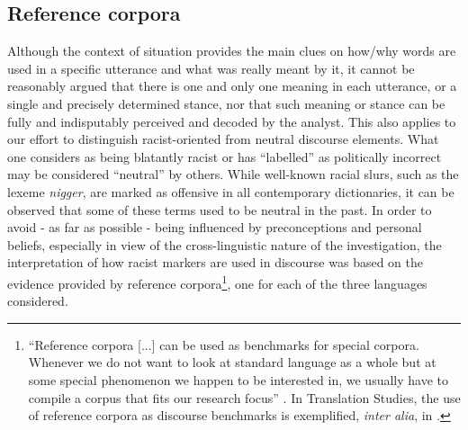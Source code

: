 \documentclass[output=paper]{LSP/langsci}
\begin{document}
\subsection{Reference corpora} \label{sec:2:3:3}

Although the context of situation provides the main clues on how/why words are used in a specific utterance and what was really meant by it, it cannot be reasonably argued that there is one and only one meaning in each utterance, or a single and precisely determined stance, nor that such meaning or stance can be fully and indisputably perceived and decoded by the analyst. This also applies to our effort to distinguish racist-oriented from neutral discourse elements. What one considers as being blatantly racist or has “labelled” as politically incorrect may be considered “neutral” by others. While well-known racial slurs, such as the lexeme \textit{nigger}, are marked as offensive in all contemporary dictionaries, it can be observed that some of these terms used to be neutral in the past. In order to avoid - as far as possible - being influenced by preconceptions and personal beliefs, especially in view of the cross-linguistic nature of the investigation, the interpretation of how racist markers are used in discourse was based on the evidence provided by reference corpora\footnote{“Reference corpora [...] can be used as benchmarks for special corpora. Whenever we do not want to look at standard language as a whole but at some special phenomenon we happen to be interested in, we usually have to compile a corpus that fits our research focus” \citep[68]{Teubert2007}. In Translation Studies, the use of reference corpora as discourse benchmarks is exemplified, \textit{inter alia}, in \citet[516]{Kenny1998}.}, one for each of the three languages considered.
\end{document}

